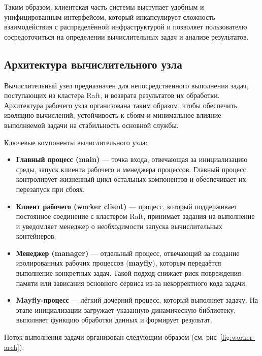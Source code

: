 Таким образом, клиентская часть системы выступает удобным
и унифицированным интерфейсом, который инкапсулирует сложность
взаимодействия с распределённой инфраструктурой и позволяет
пользователю сосредоточиться на определении вычислительных задач
и анализе результатов.

\subsection{Архитектура вычислительного узла}

Вычислительный узел предназначен для непосредственного выполнения задач,
поступающих из кластера Raft, и возврата результатов их обработки. Архитектура
рабочего узла организована таким образом, чтобы обеспечить изоляцию вычислений,
устойчивость к сбоям и минимальное влияние выполняемой задачи на стабильность
основной службы.

Ключевые компоненты вычислительного узла:
\begin{itemize}
    \item \textbf{Главный процесс (main)} — точка входа, отвечающая за
    инициализацию среды, запуск клиента рабочего и менеджера процессов. Главный
    процесс контролирует жизненный цикл остальных компонентов и обеспечивает их
    перезапуск при сбоях.
    \item \textbf{Клиент рабочего (worker client)} — процесс, который
    поддерживает постоянное соединение с кластером Raft, принимает задания на
    выполнение и уведомляет менеджер о необходимости запуска вычислительных
    контейнеров.
    \item \textbf{Менеджер (manager)} — отдельный процесс, отвечающий за
    создание изолированных рабочих процессов (\textbf{mayfly}), которым
    передаётся выполнение конкретных задач. Такой подход снижает риск
    повреждения памяти или зависания основного сервиса из-за некорректного кода
    задачи.
    \item \textbf{Mayfly-процесс} — лёгкий дочерний процесс, который выполняет
    задачу. На этапе инициализации загружает указанную динамическую библиотеку,
    выполняет функцию обработки данных и формирует результат.
\end{itemize}

Поток выполнения задачи организован следующим образом (см.
рис~\ref{fig:worker-arch}):

